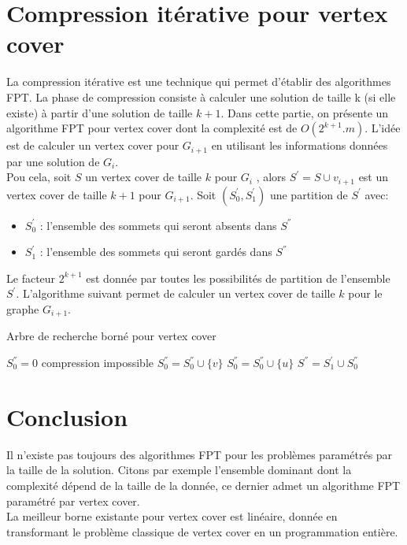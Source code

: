 \documentclass[a4paper, 12pt]{article}
\begin{document}
\section{Compression itérative pour vertex cover}
La compression itérative est une technique qui permet d'établir des algorithmes FPT. La phase de compression consiste à calculer une solution de taille k (si elle existe) à partir d'une solution de taille $k+1$. Dans cette partie, on présente un algorithme FPT pour vertex cover dont la complexité est de $O(2^{k+1}.m)$. L'idée est de calculer un vertex cover pour $G_{i+1}$ en utilisant les informations données par une solution de $G_{i}$.\\
Pou cela, soit $S$ un vertex cover de taille $k$ pour $G_{i}$ , alors $S^{'} = S \cup {v_{i+1}}$ est un vertex cover de taille $k+1$ pour $G_{i+1}$. Soit $(S_{0}^{'}, S_{1}^{'})$ une partition de $S^{'}$ avec:
\begin{itemize}
\item $S_{0}^{'}$ : l'ensemble des sommets qui seront absents dans $S^{''}$
\item $S_{1}^{'}$ : l'ensemble des sommets qui seront gardés dans $S^{''}$
\end{itemize}
Le facteur $2^{k+1}$ est donnée par toutes les possibilités de partition de l'ensemble $S^{'}$. L'algorithme suivant permet de calculer un vertex cover de taille $k$ pour le graphe $G_{i+1}$. 
\begin{center}
\begin{algorithm}[h!]
\caption{Arbre de recherche borné pour vertex cover}\label{algo_unification}
\begin{algorithmic}[1]
\STATE $S_{0}^{''} = 0$
     \STATE compression impossible 
\ENDIF
{} 
     \STATE $S_{0}^{''} = S_{0}^{''} \cup \lbrace v \rbrace$ 
\ENDIF
{} 
     \STATE $S_{0}^{''} = S_{0}^{''} \cup \lbrace u \rbrace$ 
\ENDIF
{} 
     \STATE $S^{''}= S_{1}^{'} \cup S_{0}^{''} $  
\ENDIF
\ENDFOR
\end{algorithmic}
\end{algorithm}
\end{center}
\section{Conclusion}
Il n'existe pas toujours des algorithmes FPT pour les problèmes paramétrés par la taille de la solution. Citons par exemple l'ensemble dominant dont la complexité dépend de la taille de la donnée, ce dernier admet un algorithme FPT paramétré par vertex cover. \\
La meilleur borne existante pour vertex cover est linéaire, donnée en transformant le problème classique de vertex cover en un programmation entière. 
\end{document}
